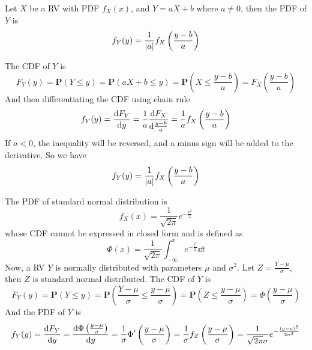 \documentclass[device=normal, lang=en]{elegantbook}
\numberwithin{equation}{section}
\begin{document}
\begin{example}[PDF of $Y = aX+b$]
    Let $X$ be a RV with PDF $f_{X}(x)$, and $Y = aX + b$ where $a \neq 0$, then the PDF of $Y$ is
    \begin{equation}
        f_{Y}(y) = \frac{1}{\abs{a}} f_{X}\left(\frac{y - b}{a}\right)
    \end{equation}
\end{example}
\begin{solution}
    The CDF of $Y$ is
    \begin{equation}
        F_{Y}(y) = \mathbf{P}(Y \leq y) = \mathbf{P}(aX + b \leq y) = \mathbf{P}\left(X \leq \frac{y - b}{a}\right) = F_{X}\left(\frac{y - b}{a}\right)
    \end{equation}
    And then differentiating the CDF using chain rule
    \begin{equation}
        f_{Y}(y) = \dv{F_{Y}}{y} = \frac{1}{a} \dv{F_{X}}{\frac{y - b}{a}} = \frac{1}{a} f_{X}\left(\frac{y - b}{a}\right)
    \end{equation}
    If $a < 0$, the inequality will be reversed, and a minus sign will be added to the derivative. So we have
    \begin{equation}
        f_{Y}(y) = \frac{1}{\abs{a}} f_{X}\left(\frac{y - b}{a}\right)
    \end{equation}
\end{solution}

\begin{example}
    The PDF of standard normal distribution is
    \begin{equation}
        f_{X}(x) = \frac{1}{\sqrt{2\pi}} e^{-\frac{x^2}{2}}
    \end{equation}
    whose CDF cannot be expressed in closed form and is defined as
    \begin{equation}
        \Phi(x) = \frac{1}{\sqrt{2\pi}} \int_{-\infty}^{x} e^{-\frac{t^2}{2}} \dd{t}
    \end{equation}
    Now, a RV $Y$ is normally distributed with parameters $\mu$ and $\sigma^2$. Let $Z = \frac{Y - \mu}{\sigma}$, then $Z$ is standard normal distributed. The CDF of $Y$ is
    \begin{equation}
        F_{Y}(y) = \mathbf{P}(Y \leq y) = \mathbf{P}\left(\frac{Y - \mu}{\sigma} \leq \frac{y - \mu}{\sigma}\right) = \mathbf{P}(Z \leq \frac{y - \mu}{\sigma}) = \Phi\left(\frac{y - \mu}{\sigma}\right)
    \end{equation}
    And the PDF of $Y$ is
    \begin{equation}
        f_{Y}(y) = \dv{F_{Y}}{y} = \dv{\Phi\left(\frac{y - \mu}{\sigma}\right)}{y} = \frac{1}{\sigma} \Phi'\left(\frac{y - \mu}{\sigma}\right) = \frac{1}{\sigma} f_{Z}\left(\frac{y - \mu}{\sigma}\right) = \frac{1}{\sqrt{2\pi}\sigma} e^{-\frac{(y - \mu)^2}{2\sigma^2}}
    \end{equation}
\end{example}
\end{document}
